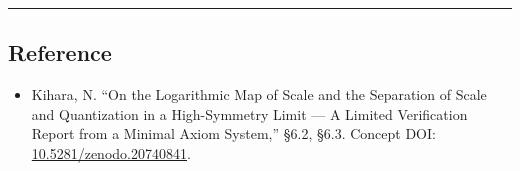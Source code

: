 \documentclass[11pt]{ltjsarticle}
\providecommand{\tightlist}{\setlength{\itemsep}{0pt}\setlength{\parskip}{0pt}}
\begin{document}
\begin{center}\rule{0.5\linewidth}{0.5pt}\end{center}

\subsection{Reference}\label{reference}

\begin{itemize}
\tightlist
\item
  Kihara, N. ``On the Logarithmic Map of Scale and the Separation of
  Scale and Quantization in a High-Symmetry Limit --- A Limited
  Verification Report from a Minimal Axiom System,'' §6.2, §6.3. Concept
  DOI:
  \href{https://doi.org/10.5281/zenodo.20740841}{10.5281/zenodo.20740841}.
\end{itemize}
\end{document}
